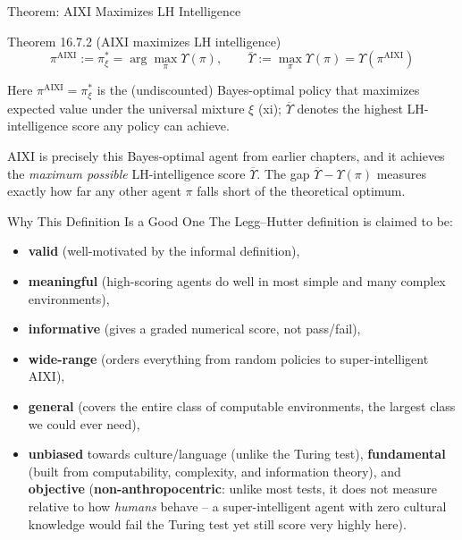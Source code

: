 \documentclass[aspectratio=169,10pt]{beamer}
\begin{document}
\begin{frame}{Theorem: AIXI Maximizes LH Intelligence}
  \begin{block}{Theorem 16.7.2 (AIXI maximizes LH intelligence)}
    \[
      \pi^{\mathrm{AIXI}} := \pi^*_\xi = \arg\max_\pi \Upsilon(\pi), \qquad
      \overline{\Upsilon} := \max_\pi \Upsilon(\pi) = \Upsilon(\pi^{\mathrm{AIXI}})
    \]
  \end{block}
  Here $\pi^{\mathrm{AIXI}} = \pi^*_\xi$ is the (undiscounted) Bayes-optimal
  policy that maximizes expected value under the universal mixture $\xi$
  (xi); $\overline{\Upsilon}$ denotes the highest LH-intelligence score any
  policy can achieve.

  \vspace{0.4em}
  AIXI is precisely this Bayes-optimal agent from earlier chapters, and it
  achieves the \emph{maximum possible} LH-intelligence score
  $\overline{\Upsilon}$. The gap $\overline{\Upsilon} - \Upsilon(\pi)$
  measures exactly how far any other agent $\pi$ falls short of the
  theoretical optimum.
\end{frame}

\begin{frame}{Why This Definition Is a Good One}
  The Legg--Hutter definition is claimed to be:
  \begin{itemize}
    \item \textbf{valid} (well-motivated by the informal definition),
    \item \textbf{meaningful} (high-scoring agents do well in most simple
      and many complex environments),
    \item \textbf{informative} (gives a graded numerical score, not
      pass/fail),
    \item \textbf{wide-range} (orders everything from random policies to
      super-intelligent AIXI),
    \item \textbf{general} (covers the entire class of computable
      environments, the largest class we could ever need),
    \item \textbf{unbiased} towards culture/language (unlike the Turing
      test), \textbf{fundamental} (built from computability, complexity,
      and information theory), and \textbf{objective}
      (\textbf{non-anthropocentric}: unlike most tests, it does not measure
      relative to how \emph{humans} behave -- a super-intelligent agent with
      zero cultural knowledge would fail the Turing test yet still score
      very highly here).
  \end{itemize}
\end{frame}
\end{document}
